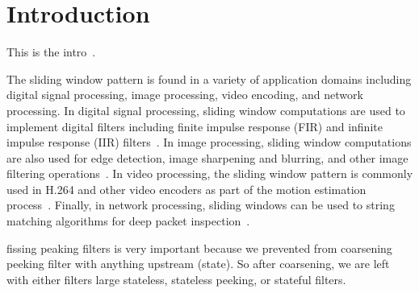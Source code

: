 \section{Introduction}

This is the intro~\cite{bakshi99}.

The sliding window pattern is found in a variety of application
domains including digital signal processing, image processing, video
encoding, and network processing.  In digital signal processing,
sliding window computations are used to implement digital filters
including finite impulse response (FIR) and infinite impulse response
(IIR) filters~\cite{NR92}.  In image processing, sliding window
computations are also used for edge detection, image sharpening and
blurring, and other image filtering
operations~\cite{Ziou97edgedetection}.  In video processing, the
sliding window pattern is commonly used in H.264 and other video
encoders as part of the motion estimation
process~\cite{Richardson03,BK97}.  Finally, in network processing,
sliding windows can be used to string matching algorithms for deep
packet inspection~\cite{Fisk02}.

fissing peaking filters is very important because we prevented from
coarsening peeking filter with anything upstream (state). So after
coarsening, we are left with either filters large stateless, stateless
peeking, or stateful filters.